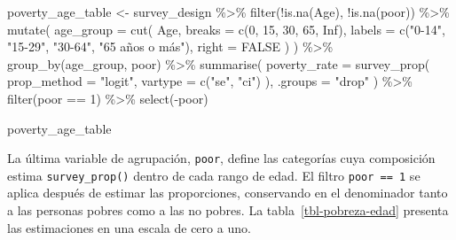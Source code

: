 \documentclass[
  spanish,
  11pt,
  letterpaper,
  oneside,
  open=any]{scrbook}
\newenvironment{Shaded}{\begin{snugshade}}{\end{snugshade}}
\newcommand{\AttributeTok}[1]{\textcolor[rgb]{0.40,0.45,0.13}{#1}}
\newcommand{\ConstantTok}[1]{\textcolor[rgb]{0.56,0.35,0.01}{#1}}
\newcommand{\DecValTok}[1]{\textcolor[rgb]{0.68,0.00,0.00}{#1}}
\newcommand{\FunctionTok}[1]{\textcolor[rgb]{0.28,0.35,0.67}{#1}}
\newcommand{\NormalTok}[1]{\textcolor[rgb]{0.00,0.23,0.31}{#1}}
\newcommand{\OtherTok}[1]{\textcolor[rgb]{0.00,0.23,0.31}{#1}}
\newcommand{\SpecialCharTok}[1]{\textcolor[rgb]{0.37,0.37,0.37}{#1}}
\newcommand{\StringTok}[1]{\textcolor[rgb]{0.13,0.47,0.30}{#1}}
\begin{document}
\begin{Shaded}
\begin{Highlighting}[]
\NormalTok{poverty\_age\_table }\OtherTok{\textless{}{-}}\NormalTok{ survey\_design }\SpecialCharTok{\%\textgreater{}\%}
  \FunctionTok{filter}\NormalTok{(}\SpecialCharTok{!}\FunctionTok{is.na}\NormalTok{(Age), }\SpecialCharTok{!}\FunctionTok{is.na}\NormalTok{(poor)) }\SpecialCharTok{\%\textgreater{}\%}
  \FunctionTok{mutate}\NormalTok{(}
    \AttributeTok{age\_group =} \FunctionTok{cut}\NormalTok{(}
\NormalTok{      Age,}
      \AttributeTok{breaks =} \FunctionTok{c}\NormalTok{(}\DecValTok{0}\NormalTok{, }\DecValTok{15}\NormalTok{, }\DecValTok{30}\NormalTok{, }\DecValTok{65}\NormalTok{, }\ConstantTok{Inf}\NormalTok{),}
      \AttributeTok{labels =} \FunctionTok{c}\NormalTok{(}\StringTok{"0{-}14"}\NormalTok{, }\StringTok{"15{-}29"}\NormalTok{, }\StringTok{"30{-}64"}\NormalTok{, }\StringTok{"65 años o más"}\NormalTok{),}
      \AttributeTok{right =} \ConstantTok{FALSE}
\NormalTok{    )}
\NormalTok{  ) }\SpecialCharTok{\%\textgreater{}\%}
  \FunctionTok{group\_by}\NormalTok{(age\_group, poor) }\SpecialCharTok{\%\textgreater{}\%}
  \FunctionTok{summarise}\NormalTok{(}
    \AttributeTok{poverty\_rate =} \FunctionTok{survey\_prop}\NormalTok{(}
      \AttributeTok{prop\_method =} \StringTok{"logit"}\NormalTok{,}
      \AttributeTok{vartype =} \FunctionTok{c}\NormalTok{(}\StringTok{"se"}\NormalTok{, }\StringTok{"ci"}\NormalTok{)}
\NormalTok{    ),}
    \AttributeTok{.groups =} \StringTok{"drop"}
\NormalTok{  ) }\SpecialCharTok{\%\textgreater{}\%}
  \FunctionTok{filter}\NormalTok{(poor }\SpecialCharTok{==} \DecValTok{1}\NormalTok{) }\SpecialCharTok{\%\textgreater{}\%}
  \FunctionTok{select}\NormalTok{(}\SpecialCharTok{{-}}\NormalTok{poor)}

\NormalTok{poverty\_age\_table}
\end{Highlighting}
\end{Shaded}

La última variable de agrupación, \texttt{poor}, define las categorías
cuya composición estima \texttt{survey\_prop()} dentro de cada rango de
edad. El filtro \texttt{poor\ ==\ 1} se aplica después de estimar las
proporciones, conservando en el denominador tanto a las personas pobres
como a las no pobres. La tabla~\ref{tbl-pobreza-edad} presenta las
estimaciones en una escala de cero a uno.
\end{document}
